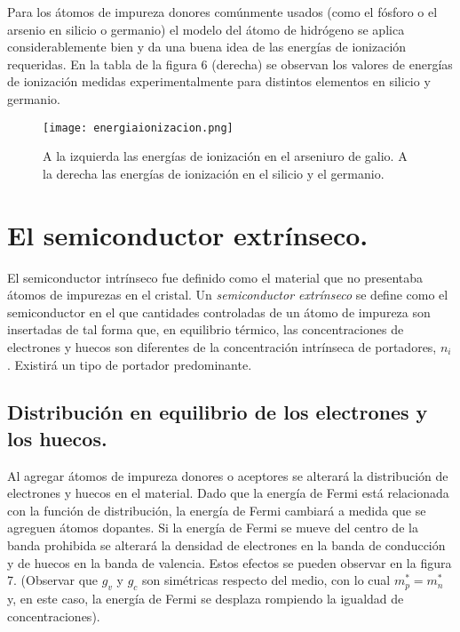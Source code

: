 \documentclass[12pt,a4paper]{article}
\begin{document}
Para los átomos de impureza donores comúnmente usados (como el fósforo o el arsenio en silicio o germanio) el modelo del átomo de hidrógeno se aplica considerablemente bien y da una buena idea de las energías de ionización requeridas. En la tabla de la figura 6 (derecha) se observan los valores de energías de ionización medidas experimentalmente para distintos elementos en silicio y germanio.

\begin{figure}[ht!]
\begin{center}
\texttt{[image: energiaionizacion.png]}
\caption{A la izquierda las energías de ionización en el arseniuro de galio. A la derecha las energías de ionización en el silicio y el germanio.}
\end{center}
\end{figure}

\section{El semiconductor extrínseco.}

El semiconductor intrínseco fue definido como el material que no presentaba átomos de impurezas en el cristal. Un \emph{semiconductor extrínseco} se define como el semiconductor en el que cantidades controladas de un átomo de impureza son insertadas de tal forma que, en equilibrio térmico, las concentraciones de electrones y huecos son diferentes de la concentración intrínseca de portadores, $n_{i}$. Existirá un tipo de portador predominante.

\subsection{Distribución en equilibrio de los electrones y los huecos.}

Al agregar átomos de impureza donores o aceptores se alterará la distribución de electrones y huecos en el material. Dado que la energía de Fermi está relacionada con la función de distribución, la energía de Fermi cambiará a medida que se agreguen átomos dopantes. Si la energía de Fermi se mueve del centro de la banda prohibida se alterará la densidad de electrones en la banda de conducción y de huecos en la banda de valencia. Estos efectos se pueden observar en la figura 7. (Observar que $g_{v}$ y $g_{c}$ son simétricas respecto del medio, con lo cual $m_{p}^{\ast}=m_{n}^{\ast}$ y, en este caso, la energía de Fermi se desplaza rompiendo la igualdad de concentraciones).
\end{document}
